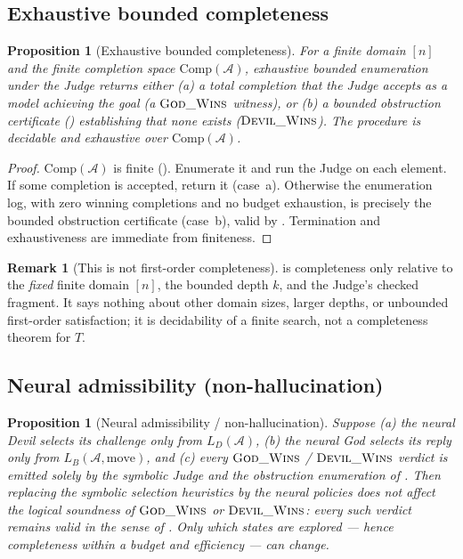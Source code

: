 \documentclass[11pt]{article}
\theoremstyle{definition}
\newtheorem{remark}{Remark}[section]
\theoremstyle{plain}
\newtheorem{proposition}[definition]{Proposition}
\newcommand{\Thy}{T}
\newcommand{\Struct}{\mathcal{A}}
\begin{document}
\subsection{Exhaustive bounded completeness}

\begin{proposition}[Exhaustive bounded completeness]\label{prop:exhaustive}
For a finite domain $[n]$ and the finite completion space $\mathrm{Comp}(\Struct)$, exhaustive bounded
enumeration under the Judge returns either (a) a total completion that the Judge accepts as a model
achieving the goal (a $\textsc{God\_Wins}$ witness), or (b) a bounded obstruction certificate
() establishing that none exists ($\textsc{Devil\_Wins}$). The procedure is
decidable and exhaustive over $\mathrm{Comp}(\Struct)$.
\end{proposition}

\begin{proof}
$\mathrm{Comp}(\Struct)$ is finite (). Enumerate it and run the Judge on each
element. If some completion is accepted, return it (case~a). Otherwise the enumeration log, with
zero winning completions and no budget exhaustion, is precisely the
bounded obstruction certificate (case~b), valid by . Termination and
exhaustiveness are immediate from finiteness.
\end{proof}

\begin{remark}[This is not first-order completeness]\label{rem:not-fo-complete}
 is completeness only relative to the \emph{fixed} finite domain $[n]$, the bounded
depth $k$, and the Judge's checked fragment. It says nothing about other domain sizes, larger depths, or
unbounded first-order satisfaction; it is decidability of a finite search, not a completeness theorem for
$\Thy$.
\end{remark}

\subsection{Neural admissibility (non-hallucination)}

\begin{proposition}[Neural admissibility / non-hallucination]\label{prop:neuraladmiss}
Suppose (a) the neural Devil selects its challenge only from $L_D(\Struct)$, (b) the neural God selects
its reply only from $L_B(\Struct,\text{move})$, and (c) every $\textsc{God\_Wins}$ / $\textsc{Devil\_Wins}$
verdict is emitted solely by the symbolic Judge and the obstruction enumeration of .
Then replacing the symbolic selection heuristics by the neural policies does not affect the logical
soundness of $\textsc{God\_Wins}$ or $\textsc{Devil\_Wins}$: every such verdict remains valid in the sense
of . Only \emph{which} states are explored --- hence completeness
within a budget and efficiency --- can change.
\end{proposition}
\end{document}
